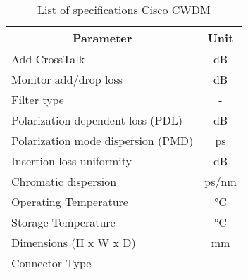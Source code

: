 \begin{table}[!ht]
	\centering
	\cite{noauthor_cisco_nodate-2}
	\begin{tabular} {|l|c|}
		\hline
		\multicolumn{1}{|c|}{\textbf{Parameter}} & \textbf{Unit} \\ \hline\hline
		Add CrossTalk & \unit{\dB} \\ \hline
		Monitor add/drop loss & \unit{\dB} \\ \hline
		Filter type & - \\ \hline
		Polarization dependent loss (PDL) & \unit{\dB} \\ \hline
		Polarization mode dispersion (PMD) & \unit{\ps} \\ \hline
		Insertion loss uniformity & \unit{\dB} \\ \hline
		Chromatic dispersion & \unit{\ps/\nm} \\ \hline
		Operating Temperature & \unit{\degreeCelsius} \\ \hline
		Storage Temperature & \unit{\degreeCelsius} \\ \hline
		Dimensions (H x W x D) & \unit{\mm} \\ \hline
		Connector Type & - \\ \hline
	\end{tabular}
	\caption{List of specifications Cisco CWDM}
	\label{table:specs3}
\end{table}

